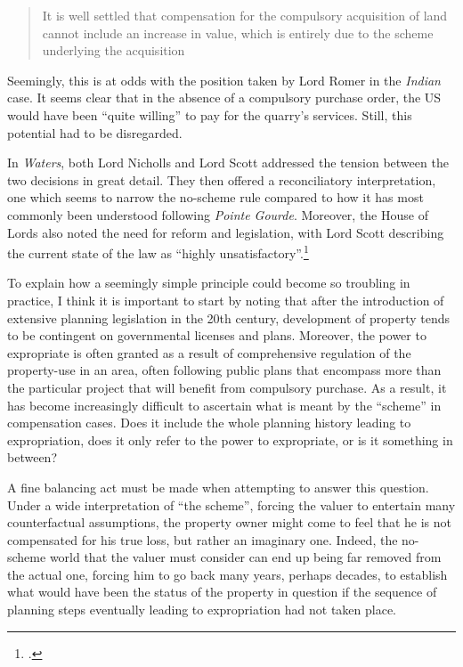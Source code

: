 \begin{quote}
It is well settled that compensation for the compulsory acquisition of
land cannot include an increase in value, which is entirely due to the
scheme underlying the acquisition
\end{quote}

Seemingly, this is at odds with the position taken by Lord Romer in the {\it Indian} case. It seems clear that in the absence of a compulsory purchase order, the US would have been ``quite willing'' to pay for the quarry's services. Still, this potential had to be disregarded. 

In \emph{Waters}, both Lord Nicholls and Lord Scott addressed the tension between the two decisions in great detail. They then offered a reconciliatory interpretation, one which seems to narrow the no-scheme rule compared to how it has most commonly been understood following \emph{Pointe Gourde}. Moreover, the House of Lords also noted the need for reform and legislation, with Lord Scott describing the current state of the law as ``highly unsatisfactory''.\footcite[164]{waters04}

To explain how a seemingly simple principle could become so troubling in practice, I think it is important to start by noting that after the introduction of extensive planning legislation in the 20th century, development of property tends to be contingent on governmental licenses and plans. Moreover, the power to expropriate is often granted as a result of comprehensive regulation of the property-use in an area, often following public plans that encompass more than the particular project that will benefit from compulsory purchase. As a result, it has become increasingly difficult to ascertain what is meant by the ``scheme'' in compensation cases. Does it include the whole planning history leading to expropriation, does it only refer to the power to expropriate, or is it something in between?

A fine balancing act must be made when attempting to answer this question. Under a wide interpretation of ``the scheme'', forcing the valuer to entertain many counterfactual assumptions, the property owner might come to feel that he is not compensated for his true loss, but rather an imaginary one. Indeed, the no-scheme world that the valuer must consider can end up being far removed from the actual one, forcing him to go back many years, perhaps decades, to establish what would have been the status of the property in question if the sequence of planning steps eventually leading to expropriation had not taken place. 

